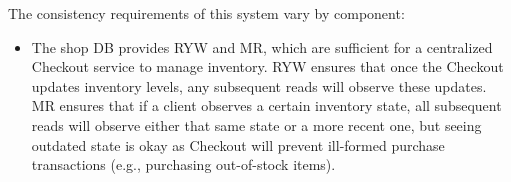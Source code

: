 %
%
%

The consistency requirements of this system vary by component:

\begin{itemize}
\item The shop DB provides RYW and MR, which are sufficient for
  a centralized Checkout service to manage inventory.
  RYW ensures that once the Checkout updates inventory levels,
  any subsequent reads will observe these updates. MR ensures that
  if a client observes a certain inventory state, all subsequent
  reads will observe either that same state or a more recent one,
  but seeing outdated state is okay as Checkout will prevent
  ill-formed purchase transactions (e.g., purchasing out-of-stock items).
\end{itemize}

